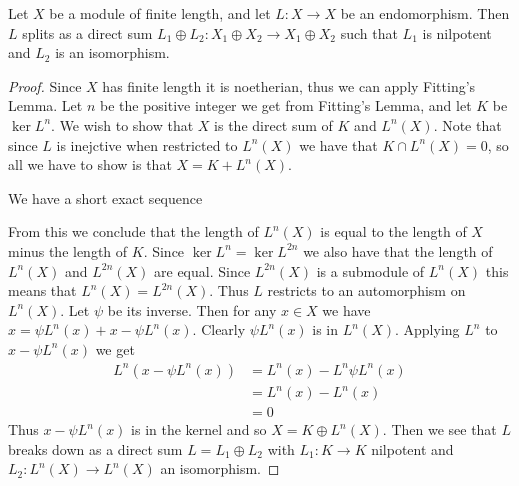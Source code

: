 \begin{cor}\label{cor:fittings_lemma_artin}
	Let $X$ be a module of finite length, and let $L\colon X\to X$ be an endomorphism. Then $L$ splits as a direct sum $L_1 \oplus L_2 \colon X_1 \oplus X_2 \to X_1 \oplus X_2$ such that $L_1$ is nilpotent and $L_2$ is an isomorphism.
	\begin{proof}
		Since $X$ has finite length it is noetherian, thus we can apply Fitting's Lemma. Let $n$ be the positive integer we get from Fitting's Lemma, and let $K$ be $\ker L^{n}$. We wish to show that $X$ is the direct sum of $K$ and $L^n(X)$. Note that since $L$ is inejctive when restricted to $L^n(X)$ we have that $K \cap L^n(X)=0$, so all we have to show is that $X = K + L^n(X)$.
	
		We have a short exact sequence
		\begin{center}
		\end{center}
		From this we conclude that the length of $L^{n}(X)$ is equal to the length of $X$ minus the length of $K$. Since $\ker L^n = \ker L^{2n}$ we also have that the length of $L^n(X)$ and $L^{2n}(X)$ are equal. Since $L^{2n}(X)$ is a submodule of $L^n(X)$ this means that $L^n(X)=L^{2n}(X)$. Thus $L$ restricts to an automorphism on $L^n(X)$. Let $\psi$ be its inverse. Then for any $x \in X$ we have $x = \psi L^n(x) + x - \psi L^n(x)$. Clearly $\psi L^n(x)$ is in $L^n(X)$. Applying $L^n$ to $x-\psi L^n(x)$ we get
		\begin{align*}
			L^n(x-\psi L^n(x)) &= L^n(x) - L^n \psi L^n (x)\\
			&= L^n(x) - L^n(x)\\
			&= 0
		\end{align*}
		Thus $ x - \psi L^n(x)$ is in the kernel and so $X = K \oplus L^n(X)$. Then we see that $L$ breaks down as a direct sum $L = L_1 \oplus L_2$ with $L_1\colon K \to K$ nilpotent and $L_2 \colon L^n(X) \to L^n(X)$ an isomorphism.
	\end{proof}
\end{cor}